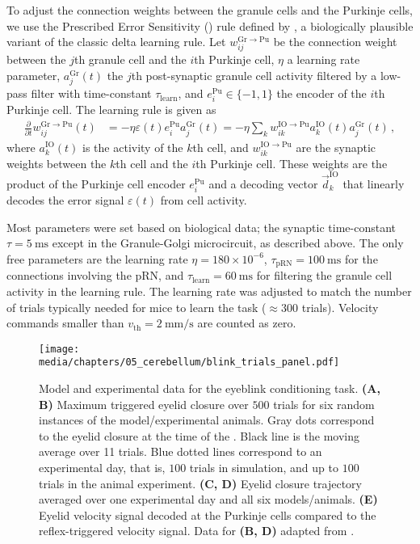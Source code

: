 To adjust the connection weights between the granule cells and the Purkinje cells, we use the Prescribed Error Sensitivity (\PES) rule defined by \citet{macneil2011finetuning}, a biologically plausible variant of the classic delta learning rule.
Let $w^{\mathrm{Gr}\to\mathrm{Pu}}_{ij}$ be the connection weight between the $j$th granule cell and the $i$th Purkinje cell, $\eta$ a learning rate parameter, $a^\mathrm{Gr}_j(t)$ the $j$th post-synaptic granule cell activity filtered by a low-pass filter with time-constant $\tau_\mathrm{learn}$, and $e^\mathrm{Pu}_i \in \{-1, 1\}$ the encoder of the $i$th Purkinje cell.
The \PES learning rule is given as
\begin{align*}
	\frac{\partial}{\partial t} w^{\mathrm{Gr}\to\mathrm{Pu}}_{ij}(t) &= -\eta \varepsilon(t) e^\mathrm{Pu}_i a^\mathrm{Gr}_j(t) = -\eta \sum_{k} w^{\mathrm{IO}\to\mathrm{Pu}}_{ik} a^\mathrm{IO}_k(t) a^\mathrm{Gr}_j(t) \,,
\end{align*}
where $a^\mathrm{IO}_k(t)$ is the activity of the $k$th \IO cell, and $w^{\mathrm{IO}\to\mathrm{Pu}}_{ik}$ are the synaptic weights between the $k$th \IO cell and the $i$th Purkinje cell.
These weights are the product of the Purkinje cell encoder $e_i^\mathrm{Pu}$ and a decoding vector $\vec d_k^\mathrm{IO}$ that linearly decodes the error signal $\varepsilon(t)$ from \IO cell activity.

Most parameters were set based on biological data; the synaptic time-constant $\tau = \SI{5}{\milli\second}$ except in the Granule-Golgi microcircuit, as described above.
The only free parameters are the learning rate $\eta=180\times 10^{-6}$, $\tau_\mathrm{pRN} = \SI{100}{\milli\second}$ for the connections involving the pRN, and $\tau_\mathrm{learn} = \SI{60}{\milli\second}$ for filtering the granule cell activity in the learning rule.
The learning rate was adjusted to match the number of trials typically needed for mice to learn the task ($\approx 300$ trials).
Velocity commands smaller than $v_\mathrm{th} = \SI{2}{\milli\metre\per\second}$ are counted as zero.

\begin{figure}
	\centering%
	\texttt{[image: media/chapters/05\_cerebellum/blink\_trials\_panel.pdf]}
	\caption[Model and experimental data for the eyeblink conditioning task]{Model and experimental data for the eyeblink conditioning task. \textbf{(A, B)} Maximum \CR triggered eyelid closure over $500$ trials for six random instances of the model/experimental animals. Gray dots correspond to the eyelid closure at the time of the \US. Black line is the moving average over 11 trials. Blue dotted lines correspond to an experimental day, that is, $100$ trials in simulation, and up to $100$ trials in the animal experiment. \textbf{(C, D)} Eyelid closure trajectory averaged over one experimental day and all six models/animals. \textbf{(E)} Eyelid velocity signal decoded at the Purkinje cells compared to the reflex-triggered velocity signal. Data for \textbf{(B, D)} adapted from \protect\citet{heiney2014cerebellardependent}.}
	\label{fig:result-basic}
\end{figure}

